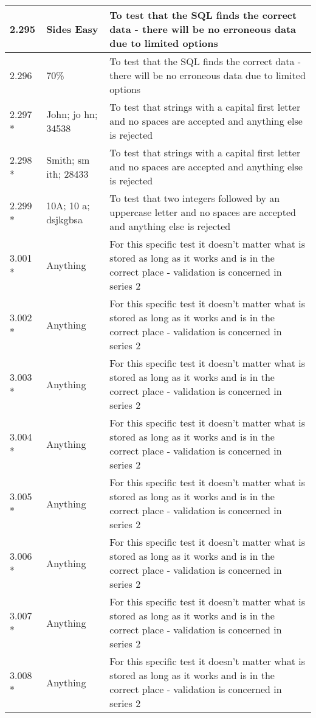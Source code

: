 \begin{landscape}
\begin{center}
\begin{longtable}{|p{4cm}|p{4cm}|p{5cm}|}
2.295 & Sides Easy & To test that the SQL finds the correct data - there will be no erroneous data due to limited options \\ \hline
2.296 & 70\% & To test that the SQL finds the correct data - there will be no erroneous data due to limited options \\ \hline
2.297 * & John; jo hn; 34538 & To test that strings with a capital first letter and no spaces are accepted and anything else is rejected \\ \hline
2.298 * & Smith; sm ith; 28433 & To test that strings with a capital first letter and no spaces are accepted and anything else is rejected \\ \hline
2.299 * & 10A; 10 a; dsjkgbsa & To test that two integers followed by an uppercase letter and no spaces are accepted and anything else is rejected \\ \hline
3.001 * & Anything & For this specific test it doesn't matter what is stored as long as it works and is in the correct place - validation is concerned in series 2 \\ \hline
3.002 * & Anything & For this specific test it doesn't matter what is stored as long as it works and is in the correct place - validation is concerned in series 2 \\ \hline
3.003 * & Anything & For this specific test it doesn't matter what is stored as long as it works and is in the correct place - validation is concerned in series 2 \\ \hline
3.004 * & Anything & For this specific test it doesn't matter what is stored as long as it works and is in the correct place - validation is concerned in series 2 \\ \hline 
3.005 * & Anything & For this specific test it doesn't matter what is stored as long as it works and is in the correct place - validation is concerned in series 2 \\ \hline
3.006 * & Anything & For this specific test it doesn't matter what is stored as long as it works and is in the correct place - validation is concerned in series 2 \\ \hline
3.007 * & Anything & For this specific test it doesn't matter what is stored as long as it works and is in the correct place - validation is concerned in series 2 \\ \hline
3.008 * & Anything & For this specific test it doesn't matter what is stored as long as it works and is in the correct place - validation is concerned in series 2 \\ \hline

\end{longtable}
\end{center}
\end{landscape}
